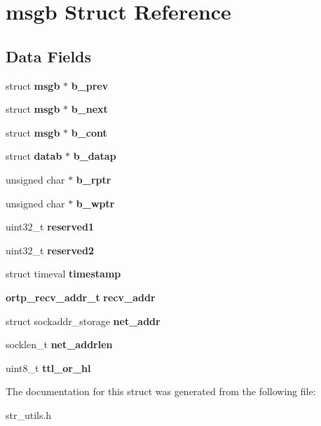 \section{msgb Struct Reference}
\label{structmsgb}
\subsection*{Data Fields}
\begin{DoxyCompactItemize}
\item 
\mbox{\label{structmsgb_ae4ee42093f65d113f225c2f19c7102cf}} 
struct \textbf{ msgb} $\ast$ {\bfseries b\+\_\+prev}
\item 
\mbox{\label{structmsgb_a53545481a0c29276c5342fe0f2dca524}} 
struct \textbf{ msgb} $\ast$ {\bfseries b\+\_\+next}
\item 
\mbox{\label{structmsgb_a1cbafb4e20ab6c0892b45bdcf8f223ff}} 
struct \textbf{ msgb} $\ast$ {\bfseries b\+\_\+cont}
\item 
\mbox{\label{structmsgb_a1a1c393d5ff9c40a3da749bc42963cb8}} 
struct \textbf{ datab} $\ast$ {\bfseries b\+\_\+datap}
\item 
\mbox{\label{structmsgb_a45f2607c0243b32392e98ec8c3c0fde7}} 
unsigned char $\ast$ {\bfseries b\+\_\+rptr}
\item 
\mbox{\label{structmsgb_a3ad6017602a797398fd3f5fab67f12c1}} 
unsigned char $\ast$ {\bfseries b\+\_\+wptr}
\item 
\mbox{\label{structmsgb_a64e2ea85bf39e837fa27905c90ab3d3f}} 
uint32\+\_\+t {\bfseries reserved1}
\item 
\mbox{\label{structmsgb_a6cc037dd99297546c03971a3499e233c}} 
uint32\+\_\+t {\bfseries reserved2}
\item 
\mbox{\label{structmsgb_afef9f7e36e1793f4df807400f6dd8033}} 
struct timeval {\bfseries timestamp}
\item 
\mbox{\label{structmsgb_a2874218158d243778fab9a4b8bc993d0}} 
\textbf{ ortp\+\_\+recv\+\_\+addr\+\_\+t} {\bfseries recv\+\_\+addr}
\item 
\mbox{\label{structmsgb_a0f0468005b691e5bdf7d4dfbb139403f}} 
struct sockaddr\+\_\+storage {\bfseries net\+\_\+addr}
\item 
\mbox{\label{structmsgb_a0963c34e24fe0b92abc7db24b537a8fa}} 
socklen\+\_\+t {\bfseries net\+\_\+addrlen}
\item 
\mbox{\label{structmsgb_a20861d711f215c580ea4491c15c93fb4}} 
uint8\+\_\+t {\bfseries ttl\+\_\+or\+\_\+hl}
\end{DoxyCompactItemize}


The documentation for this struct was generated from the following file\+:\begin{DoxyCompactItemize}
\item 
str\+\_\+utils.\+h\end{DoxyCompactItemize}
